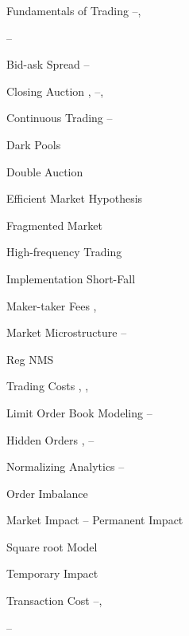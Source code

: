 \begin{multicols}{2}
\noindent Fundamentals of Trading \hfill \pageref{in:fund_trade1}--\pageref{in:fund_trade2}, \par \hfill \pageref{in:fund_trade3}--\pageref{in:fund_trade4} \par
\twoindent Bid-ask Spread \hfill \pageref{in:bidask1}--\pageref{in:bidask2} \par
\twoindent Closing Auction \hfill \pageref{in:close1}, \pageref{in:close2}--\pageref{in:close3}, \pageref{in:close4} \par
\twoindent Continuous Trading \hfill \pageref{in:cont_trade1}--\pageref{in:cont_trade2} \par
\twoindent Dark Pools \hfill \pageref{in:dark} \par
\twoindent Double Auction \hfill \pageref{in:double} \par
\twoindent Efficient Market Hypothesis \hfill \pageref{in:efficient} \par
\twoindent Fragmented Market \hfill \pageref{in:fragmented} \par
\twoindent High-frequency Trading \hfill \pageref{in:higheff} \par
\twoindent Implementation Short-Fall \hfill \pageref{in:shortfall} \par
\twoindent Maker-taker Fees \hfill \pageref{in:takerfee1}, \pageref{in:takerfee2} \par
\twoindent Market Microstructure \hfill \pageref{in:micro1}--\pageref{in:micro2} \par
\twoindent Reg NMS \hfill \pageref{in:regnms} \par
\twoindent Trading Costs \hfill \pageref{in:tradecost1}, \pageref{in:tradecost2}, \pageref{in:tradecost3} \par
\vspace{\baselineskip}


\noindent Limit Order Book Modeling  \pageref{in:labmod1}--\pageref{in:labmod2} \par
\twoindent Hidden Orders \hfill \pageref{in:hidden1}, \pageref{in:hidden2}--\pageref{in:hidden3} \par
\twoindent Normalizing Analytics \hfill \pageref{in:norm1}--\pageref{in:norm2} \par
\twoindent Order Imbalance \hfill \pageref{in:imbalance} \par
\vspace{\baselineskip}


\noindent Market Impact \hfill \pageref{in:impact1}--\pageref{in:impact2}
\twoindent Permanent Impact \hfill \pageref{in:permimp} \par
\twoindent Square root Model \hfill \pageref{in:sqmodel} \par
\twoindent Temporary Impact \hfill \pageref{in:tempimpact} \par
\twoindent Transaction Cost \hfill \pageref{in:transcost1}--\pageref{in:transcost2}, \par \hfill \pageref{in:transcost3}--\pageref{in:transcost4} \par
\vspace{\baselineskip}



\end{multicols}
